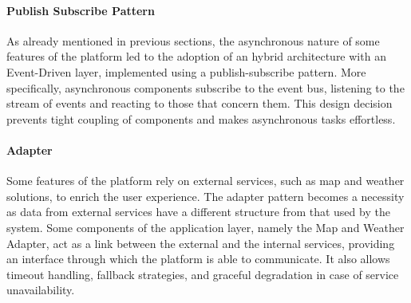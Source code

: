 \paragraph{Publish Subscribe Pattern}
As already mentioned in previous sections, the asynchronous nature of some features of the platform led 
to the adoption of an hybrid architecture with an Event-Driven layer, implemented using a publish-subscribe pattern. More specifically, asynchronous components subscribe to the event bus, listening to the stream of events and reacting to those that concern them. This design decision prevents tight coupling of components and makes asynchronous tasks effortless.

\paragraph{Adapter}
Some features of the platform rely on external services, such as map and weather solutions, to enrich the user experience. The adapter pattern becomes a necessity as data from external services have a different structure from that used by the system. Some components of the application layer, namely the Map and Weather Adapter, act as a link between the external and the internal services, providing an interface through which the platform is able to communicate. It also allows timeout handling, fallback strategies, and graceful degradation in case of service unavailability. 

